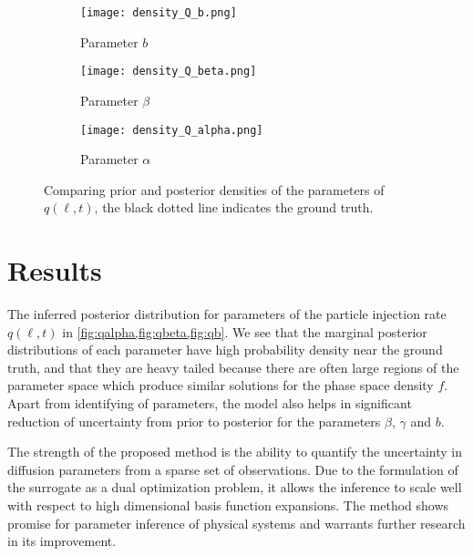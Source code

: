 \begin{figure*}[!htb]
  \centering
  \begin{subfigure}[b]{0.5\textwidth}
    \centering
    \texttt{[image: density\_Q\_b.png]}
    \caption{ Parameter $b$}
    \label{fig:qb}
  \end{subfigure}
  \hfill
  \begin{subfigure}[b]{0.5\textwidth}
    \centering
    \texttt{[image: density\_Q\_beta.png]}
    \caption{Parameter $\beta$}
    \label{fig:qbeta}
  \end{subfigure}
  \hfill
  \begin{subfigure}[b]{0.5\textwidth}
    \centering
    \texttt{[image: density\_Q\_alpha.png]}
    \caption{Parameter $\alpha$}
    \label{fig:qalpha}
  \end{subfigure}
  \caption{Comparing prior and posterior densities of the parameters of $q(\ell, t)$, 
  the black dotted line indicates the ground truth.}  
\end{figure*}


\section{Results}

The inferred posterior distribution for parameters of the particle injection rate $q(\ell, t)$ in 
\cref{fig:qalpha,fig:qbeta,fig:qb}. We see that the marginal posterior distributions of each 
parameter have high probability density near the ground truth, and that they are heavy tailed 
because there are often large regions of the parameter space which produce similar solutions for 
the phase space density $f$. Apart from identifying of parameters, the model also helps in 
significant reduction of uncertainty from prior to posterior for the parameters $\beta$, 
$\gamma$ and $b$.

The strength of the proposed method is the ability to quantify the uncertainty in diffusion 
parameters from a sparse set of observations. Due to the formulation of the surrogate as a dual 
optimization problem, it allows the inference to scale well with respect to high dimensional basis 
function expansions. The method shows promise for parameter inference of physical systems and 
warrants further research in its improvement.




